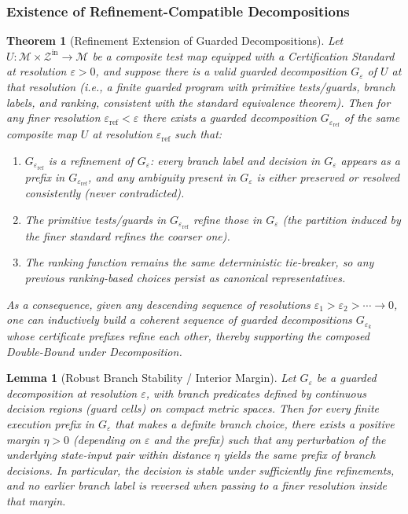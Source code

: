 \documentclass[12pt]{article}
\theoremstyle{definition}
\theoremstyle{plain}
\newtheorem{theorem}{Theorem}[section]
\newtheorem{lemma}{Lemma}[section]
\begin{document}
\subsubsection*{Existence of Refinement-Compatible Decompositions}
\label{subsub:refinement-existence}

\begin{theorem}[Refinement Extension of Guarded Decompositions]
\label{thm:refinement-extension}
Let \(U:\mathcal M\times\mathcal Z^{\mathrm{in}}\to\mathcal M\) be a composite test map equipped with a Certification Standard at resolution \(\varepsilon>0\), and suppose there is a valid guarded decomposition \(G_\varepsilon\) of \(U\) at that resolution (i.e., a finite guarded program with primitive tests/guards, branch labels, and ranking, consistent with the standard equivalence theorem). Then for any finer resolution \(\varepsilon_{\mathrm{ref}}<\varepsilon\) there exists a guarded decomposition \(G_{\varepsilon_{\mathrm{ref}}}\) of the same composite map \(U\) at resolution \(\varepsilon_{\mathrm{ref}}\) such that:
\begin{enumerate}[itemsep=1pt]
  \item \(G_{\varepsilon_{\mathrm{ref}}}\) is a \emph{refinement} of \(G_\varepsilon\): every branch label and decision in \(G_\varepsilon\) appears as a prefix in \(G_{\varepsilon_{\mathrm{ref}}}\), and any ambiguity present in \(G_\varepsilon\) is either preserved or resolved consistently (never contradicted).  
  \item The primitive tests/guards in \(G_{\varepsilon_{\mathrm{ref}}}\) refine those in \(G_\varepsilon\) (the partition induced by the finer standard refines the coarser one).  
  \item The ranking function remains the same deterministic tie-breaker, so any previous ranking-based choices persist as canonical representatives.  
\end{enumerate}
As a consequence, given any descending sequence of resolutions \(\varepsilon_1>\varepsilon_2>\cdots\to0\), one can inductively build a coherent sequence of guarded decompositions \(G_{\varepsilon_k}\) whose certificate prefixes refine each other, thereby supporting the composed Double-Bound under Decomposition.
\end{theorem}

\begin{lemma}[Robust Branch Stability / Interior Margin]
\label{lem:branch-stability-margin}
Let \(G_\varepsilon\) be a guarded decomposition at resolution \(\varepsilon\), with branch predicates defined by continuous decision regions (guard cells) on compact metric spaces. Then for every finite execution prefix in \(G_\varepsilon\) that makes a definite branch choice, there exists a positive margin \(\eta>0\) (depending on \(\varepsilon\) and the prefix) such that any perturbation of the underlying state-input pair within distance \(\eta\) yields the same prefix of branch decisions. In particular, the decision is stable under sufficiently fine refinements, and no earlier branch label is reversed when passing to a finer resolution inside that margin.
\end{lemma}
\end{document}
